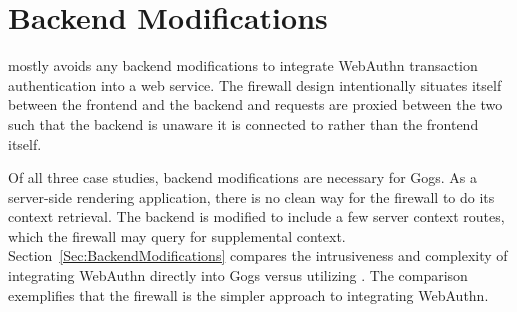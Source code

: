 



\section{Backend Modifications}

\sys{} mostly avoids any backend modifications to integrate WebAuthn transaction authentication into a web service. The firewall design intentionally situates itself between the frontend and the backend and requests are proxied between the two such that the backend is unaware it is connected to \sys{} rather than the frontend itself.

Of all three case studies, backend modifications are necessary for Gogs. As a server-side rendering application, there is no clean way for the firewall to do its context retrieval. The backend is modified to include a few server context routes, which the firewall may query for supplemental context. Section~\ref{Sec:BackendModifications} compares the intrusiveness and complexity of integrating WebAuthn directly into Gogs versus utilizing \sys{}. The comparison exemplifies that the firewall is the simpler approach to integrating WebAuthn.








